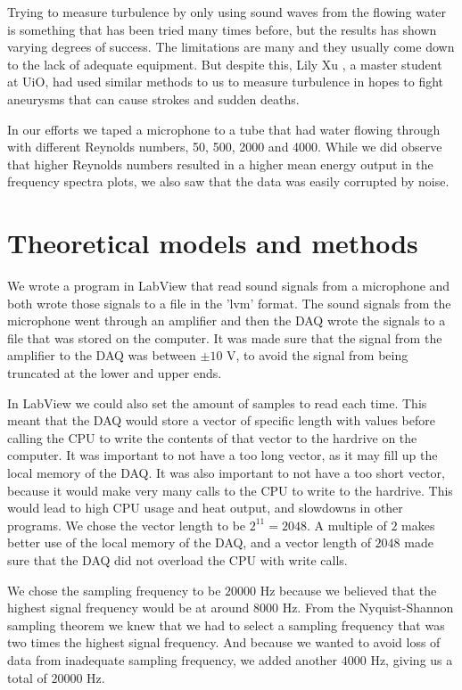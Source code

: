 \documentclass[english,a4paper,12pt]{article}
\begin{document}
Trying to measure turbulence by only using sound waves from the flowing water is something that has been tried many times before, but the results has shown varying degrees of success. The limitations are many and they usually come down to the lack of adequate equipment. But despite this, Lily Xu \cite{SoundofTurbulence}, a master student at UiO, had used similar methods to us to measure turbulence in hopes to fight aneurysms that can cause strokes and sudden deaths. \bigskip 

In our efforts we taped a microphone to a tube that had water flowing through with different Reynolds numbers, 50, 500, 2000 and 4000. While we did observe that higher Reynolds numbers resulted in a higher mean energy output in the frequency spectra plots, we also saw that the data was easily corrupted by noise.

\section*{Theoretical models and methods}
We wrote a program in LabView that read sound signals from a microphone and both wrote those signals to a file in the 'lvm' format. The sound signals from the microphone went through an amplifier and then the DAQ wrote the signals to a file that was stored on the computer. It was made sure that the signal from the amplifier to the DAQ was between $\pm 10$ V, to avoid the signal from being truncated at the lower and upper ends. \bigskip 

In LabView we could also set the amount of samples to read each time. This meant that the DAQ would store a vector of specific length with values before calling the CPU to write the contents of that vector to the hardrive on the computer. It was important to not have a too long vector, as it may fill up the local memory of the DAQ. It was also important to not have a too short vector, because it would make very many calls to the CPU to write to the hardrive. This would lead to high CPU usage and heat output, and slowdowns in other programs. We chose the vector length to be $2^{11} = 2048$. A multiple of $2$ makes better use of the local memory of the DAQ, and a vector length of $2048$ made sure that the DAQ did not overload the CPU with write calls. \bigskip

We chose the sampling frequency to be $20000$ Hz because we believed that the highest signal frequency would be at around $8000$ Hz. From the Nyquist-Shannon sampling theorem we knew that we had to select a sampling frequency that was two times the highest signal frequency. And because we wanted to avoid loss of data from inadequate sampling frequency, we added another $4000$ Hz, giving us a total of $20000$ Hz. \bigskip
\end{document}
